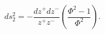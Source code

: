 \begin{equation}
ds_{2}^{2}=-\frac{dz^{+}dz^{-}}{z^{+}z^{-}}\left( \frac{\Phi ^{2}-1}{\Phi
^{2}}\right) .
\label{confmetric}\end{equation}

